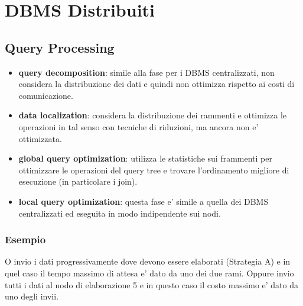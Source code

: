 \chapter{DBMS Distribuiti}


\section{Query Processing}


\begin{itemize}
  \item \textbf{query decomposition}: simile alla fase per i DBMS centralizzati, non considera la distribuzione dei dati e quindi non ottimizza rispetto ai costi di comunicazione.
  \item \textbf{data localization}: considera la distribuzione dei rammenti e ottimizza le operazioni in tal senso con tecniche di riduzioni, ma ancora non e' ottimizzata.
  \item \textbf{global query optimization}: utilizza le statistiche sui frammenti per ottimizzare le operazioni del query tree e trovare l'ordinamento migliore di esecuzione (in particolare i join).
  \item \textbf{local query optimization}: questa fase e' simile a quella dei DBMS centralizzati ed eseguita in modo indipendente sui nodi.
\end{itemize}

\subsection{Esempio}





O invio i dati progressivamente dove devono essere elaborati (Strategia A) e in quel caso il tempo massimo di attesa e' dato da uno dei due rami.
Oppure invio tutti i dati al nodo di elaborazione 5 e in questo caso il costo massimo e' dato da uno degli invii.

